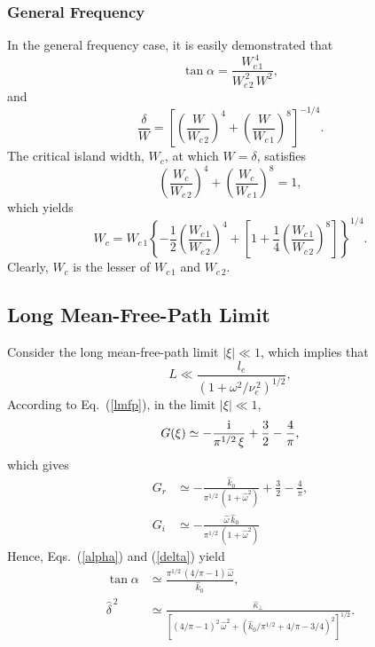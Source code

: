 \documentclass[12pt,prb,aps]{revtex4-1}
\begin{document}
\subsubsection{General Frequency}
In the general frequency case, it is easily demonstrated that
\begin{equation}
\tan\alpha  = \frac{W_{c\,1}^{\,4}}{W_{c\,2}^{\,2}\,W^2},
\end{equation}
and
\begin{equation}
\frac{\delta}{W} = \left[\left(\frac{W}{W_{c\,2}}\right)^4 + \left(\frac{W}{W_{c\,1}}\right)^8\right]^{-1/4}.
\end{equation}
The critical island width, $W_c$,  at which $W=\delta$, satisfies
\begin{equation}
\left(\frac{W_c}{W_{c\,2}}\right)^4 + \left(\frac{W_c}{W_{c\,1}}\right)^8= 1,
\end{equation}
which yields 
\begin{equation}
W_c= W_{c\,1}\left\{-\frac{1}{2}
\left(\frac{W_{c\,1}}{W_{c\,2}}\right)^4
+\left[1+\frac{1}{4}\left(\frac{W_{c\,1}}{W_{c\,2}}\right)^8\right]
\right\}^{1/4}.
\end{equation}
Clearly, $W_c$ is the lesser of $W_{c\,1}$ and $W_{c\,2}$. 

\subsection{Long Mean-Free-Path Limit}
Consider the long mean-free-path limit 
 $|\xi|\ll 1$, which implies that
\begin{equation}
L\ll \frac{l_e}{(1+\omega^2/\nu_e^{\,2})^{1/2}},
\end{equation}
According to Eq.~(\ref{lmfp}), in the limit $|\xi|\ll 1$, 
\begin{equation}
G(\xi) \simeq -\frac{{\rm i}}{\pi^{1/2}\,\xi} + \frac{3}{2}-\frac{4}{\pi},
\end{equation}
which gives
\begin{align}
G_r&\simeq -\frac{\hat{k}_0}{\pi^{1/2}\,(1+\hat{\omega}^2)}+\frac{3}{2}-\frac{4}{\pi},\\[0.5ex]
G_i &\simeq -\frac{\hat{\omega}\,\hat{k}_0}{\pi^{1/2}\,(1+\hat{\omega}^2)}
\end{align}
Hence, Eqs.~(\ref{alpha}) and (\ref{delta}) yield
\begin{align}\label{e135}
\tan\alpha&\simeq \frac{\pi^{1/2}\,(4/\pi-1)\,\hat{\omega}}{\hat{k}_0},\\[0.5ex]
\hat{\delta}^{\,2}&\simeq \frac{\hat{\kappa}_\perp}{[(4/\pi-1)^2\,\hat{\omega}^2 + (\hat{k}_0/\pi^{1/2}+4/\pi-3/4)^2]^{1/2}}.\label{e136}
\end{align}
\end{document}
